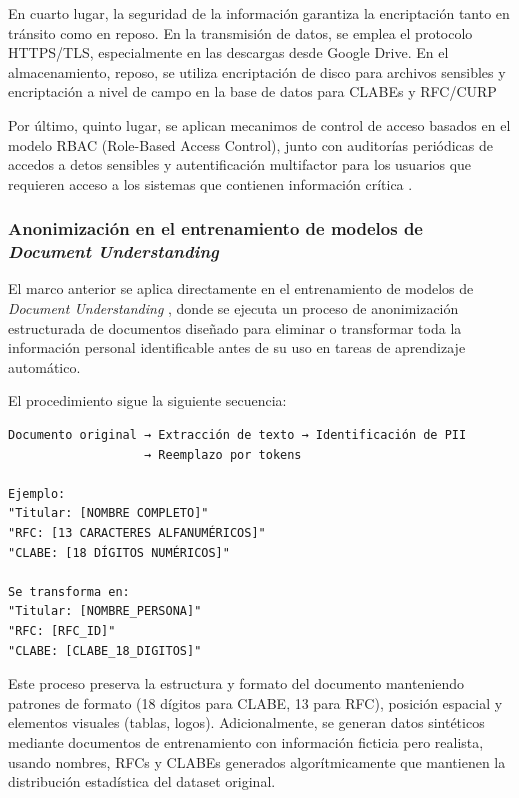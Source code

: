 En cuarto lugar, la seguridad de la información garantiza la encriptación tanto en tránsito como en reposo. En la transmisión de datos, se emplea el protocolo HTTPS/TLS, especialmente en las descargas desde Google Drive. En el almacenamiento, reposo, se utiliza encriptación de disco para archivos sensibles y encriptación a nivel de campo en la base de datos para CLABEs y RFC/CURP

Por último, quinto lugar, se aplican mecanimos de control de acceso basados en el modelo RBAC (Role-Based Access Control), junto con auditorías periódicas de accedos a detos sensibles y autentificación multifactor para los usuarios que requieren acceso a los sistemas que contienen información crítica \cite{nist_pii}.

\subsubsection{Anonimización en el entrenamiento de modelos de \textit{Document Understanding}}

El marco anterior se aplica directamente en el entrenamiento de modelos de \textit{Document Understanding} \cite{google_docunderstanding}, donde se ejecuta un proceso de anonimización estructurada de documentos diseñado para eliminar o transformar toda la información personal identificable antes de su uso en tareas de aprendizaje automático.

El procedimiento sigue la siguiente secuencia:

\begin{verbatim}
Documento original → Extracción de texto → Identificación de PII 
                   → Reemplazo por tokens

Ejemplo:
"Titular: [NOMBRE COMPLETO]"
"RFC: [13 CARACTERES ALFANUMÉRICOS]"
"CLABE: [18 DÍGITOS NUMÉRICOS]"

Se transforma en:
"Titular: [NOMBRE_PERSONA]"
"RFC: [RFC_ID]"
"CLABE: [CLABE_18_DIGITOS]"
\end{verbatim}

\noindent Este proceso preserva la estructura y formato del documento manteniendo patrones de formato (18 dígitos para CLABE, 13 para RFC), posición espacial y elementos visuales (tablas, logos). Adicionalmente, se generan datos sintéticos mediante documentos de entrenamiento con información ficticia pero realista, usando nombres, RFCs y CLABEs generados algorítmicamente que mantienen la distribución estadística del dataset original.


